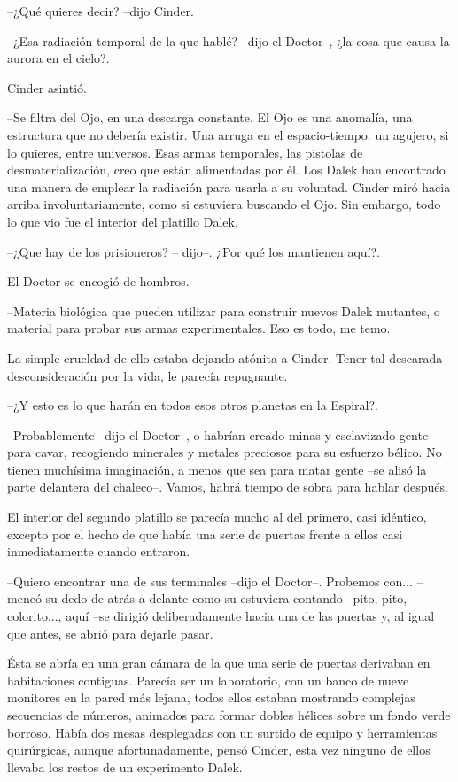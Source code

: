 --¿Qué quieres decir? --dijo Cinder. 

--¿Esa radiación temporal de la que hablé? --dijo el Doctor--, ¿la cosa que causa la aurora en el cielo?.

Cinder asintió.

--Se filtra del Ojo, en una descarga constante. El Ojo es una anomalía, una estructura que no debería existir. Una arruga en el espacio-tiempo: un agujero, si lo quieres, entre universos. Esas armas temporales, las pistolas de desmaterialización, creo que están alimentadas por él. Los Dalek han encontrado una manera de emplear la radiación para usarla a su voluntad.
Cinder miró hacia arriba involuntariamente, como si estuviera buscando el Ojo. Sin embargo, todo lo que vio fue el interior del platillo Dalek. 

--¿Que hay de los prisioneros? -- dijo--. ¿Por qué los mantienen aquí?.

El Doctor se encogió de hombros. 

--Materia biológica que pueden utilizar para construir nuevos Dalek mutantes, o material para probar sus armas experimentales. Eso es todo, me temo.

La simple crueldad de ello estaba dejando atónita a Cinder. Tener tal descarada desconsideración por la vida, le parecía repugnante. 

--¿Y esto es lo que harán en todos esos otros planetas en la Espiral?.

--Probablemente --dijo el Doctor--, o habrían creado minas y esclavizado gente para cavar, recogiendo minerales y metales preciosos para su esfuerzo bélico. No tienen muchísima imaginación, a menos que sea para matar gente --se alisó la parte delantera del chaleco--. Vamos, habrá tiempo de sobra para hablar después.

El interior del segundo platillo se parecía mucho al del primero, casi idéntico, excepto por el hecho de que había una serie de puertas frente a ellos casi inmediatamente cuando entraron.

--Quiero encontrar una de sus terminales --dijo el Doctor--. Probemos con... --meneó su dedo de atrás a delante como su estuviera contando-- pito, pito, colorito..., aquí --se dirigió deliberadamente hacia una de las puertas y, al igual que antes, se abrió para dejarle pasar.

Ésta se abría en una gran cámara de la que una serie de puertas derivaban en habitaciones contiguas. Parecía ser un laboratorio, con un banco de nueve monitores en la pared más lejana, todos ellos estaban mostrando complejas secuencias de números, animados para formar dobles hélices sobre un fondo verde borroso.
Había dos mesas desplegadas con un surtido de equipo y herramientas quirúrgicas, aunque afortunadamente, pensó Cinder, esta vez ninguno de ellos llevaba los restos de un experimento Dalek.

